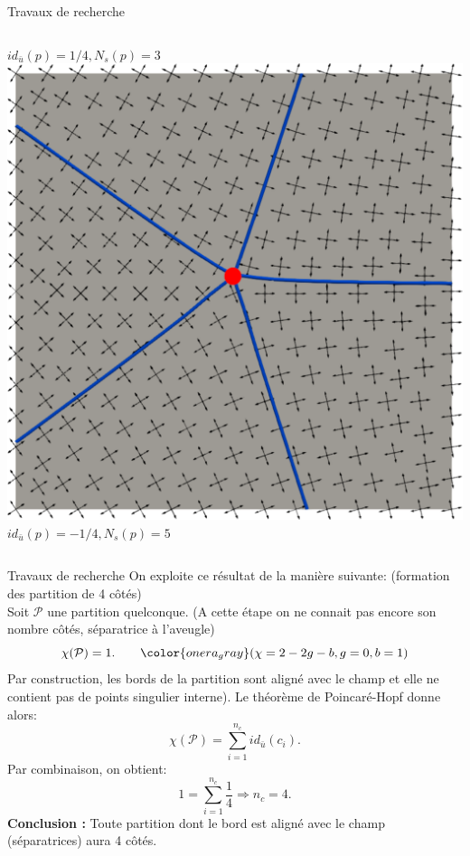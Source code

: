 \documentclass[compress,10pt,aspectratio=169]{beamer}
\begin{document}
\begin{frame}{Travaux de recherche}
\begin{columns}
\begin{column}{0.3\textwidth}
  \scriptsize $id_{\bar{u}}(p)=1/4, N_s(p) = 3$
  \\\vspace{0.1cm}
  \includegraphics[scale=0.1]{images/sepa_5.pdf}
  \scriptsize $id_{\bar{u}}(p)=-1/4, N_s(p) = 5$
  \\\vspace{0.3cm}
    \end{column}
\end{columns}

\end{frame}

\begin{frame}{Travaux de recherche}
\small
\vspace{-0.2cm}
On exploite ce résultat de la manière suivante: {\color{onera_gray} (formation des partition de 4 côtés)}\\\vspace{0.1cm}
 Soit $\mathcal{P}$ une partition quelconque. {\color{onera_gray} (A cette étape on ne connait pas encore son nombre côtés, séparatrice à l'aveugle)}
$$\chi(\mathcal{P})=1. \quad\quad{\color{onera_gray} (\chi=2-2g-b, g=0, b=1)}$$
Par construction, les bords de la partition sont aligné avec le champ et elle ne contient pas de points singulier interne). Le théorème de Poincaré-Hopf donne alors:
$$\chi(\mathcal{P})=\sum_{i=1}^{n_c}id_{\bar{u}}(c_i).$$
Par combinaison, on obtient:
$$1=\sum_{i=1}^{n_c}\frac{1}{4}\Longrightarrow n_c=4.$$
\textbf{Conclusion :} Toute partition dont le bord est aligné avec le champ (séparatrices) aura 4 côtés.
\vspace{0.4cm}
\end{frame}
\end{document}
